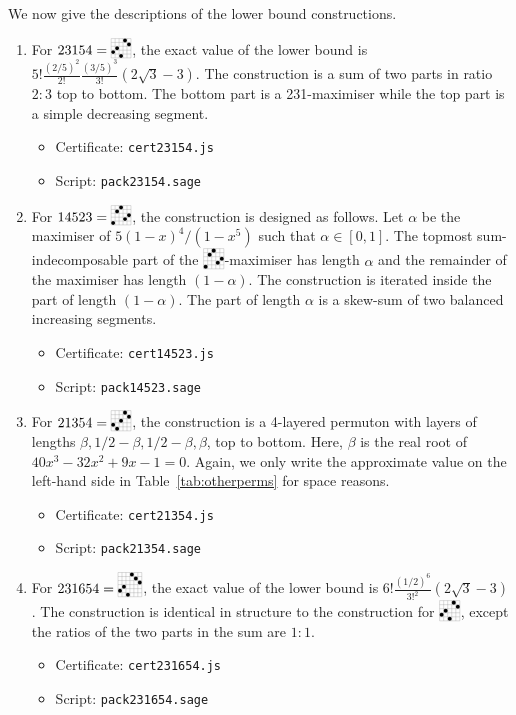\documentclass[12pt, a4paper, twoside]{report}
\begin{document}
We now give the descriptions of the lower bound constructions.
\begin{enumerate}
\item For $23154 = \bcaoba$, the exact value of the lower bound is $5!\frac{(2/5)^2}{2!}\frac{(3/5)^3}{3!}(2\sqrt{3}-3)$. The construction is a sum of two parts in ratio $2:3$ top to bottom. The bottom part is a 231-maximiser while the top part is a simple decreasing segment.
  \begin{itemize}
  \item Certificate: \texttt{cert23154.js}
  \item Script: \texttt{pack23154.sage}
  \end{itemize}
\item For $14523 = \aobamba$, the construction is designed as follows. Let $\alpha$ be the maximiser of $5(1-x)^4/(1-x^5)$ such that $\alpha \in [0,1]$. The topmost sum-indecomposable part of the $\aobamba$-maximiser has length $\alpha$ and the remainder of the maximiser has length $(1-\alpha)$. The construction is iterated inside the part of length $(1-\alpha)$. The part of length $\alpha$ is a skew-sum of two balanced increasing segments.
  \begin{itemize}
  \item Certificate: \texttt{cert14523.js}
  \item Script: \texttt{pack14523.sage}
  \end{itemize}
\item For $21354 = \baoaoba$, the construction is a 4-layered permuton with layers of lengths $\beta, 1/2-\beta, 1/2-\beta, \beta$, top to bottom. Here, $\beta$ is the real root of $40x^3 - 32x^2 + 9x - 1 = 0$. Again, we only write the approximate value on the left-hand side in Table~\ref{tab:otherperms} for space reasons.
  \begin{itemize}
  \item Certificate: \texttt{cert21354.js}
  \item Script: \texttt{pack21354.sage}
  \end{itemize}
\item For $231654 = \bcaocba$, the exact value of the lower bound is $6!\frac{(1/2)^6}{3!^2}(2\sqrt{3}-3)$. The construction is identical in structure to the construction for $\bcaoba$, except the ratios of the two parts in the sum are $1:1$.
  \begin{itemize}
  \item Certificate: \texttt{cert231654.js}
  \item Script: \texttt{pack231654.sage}

\end{itemize}
\end{enumerate}
\end{document}
